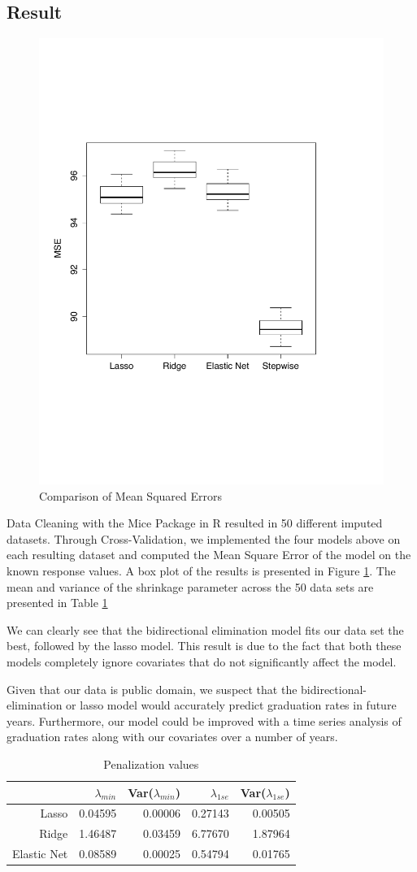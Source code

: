\documentclass{article}
\begin{document}
\subsection{Result}

\begin{figure}[h]
\begin{center}
 \includegraphics[width = .5\textwidth]{graphics/Prediction_BoxPlot.pdf}
\end{center}
\caption{Comparison of Mean Squared Errors \label{boxplot}}
\end{figure}

Data Cleaning with the Mice Package in R resulted in 50 different imputed datasets. Through Cross-Validation, we implemented the four models above on each resulting dataset and computed the Mean Square Error of the model on the known response values. A box plot of the results is presented in Figure \ref{boxplot}.  The mean and variance of the shrinkage parameter across the 50 data sets are presented in Table \ref{lambda}

We can clearly see that the bidirectional elimination model fits our data set the best, followed by the lasso model. This result is due to the fact that both these models completely ignore covariates that do not significantly affect the model. 

Given that our data is public domain, we suspect that the bidirectional-elimination or lasso model would accurately predict graduation rates in future years. Furthermore, our model could be improved with a time series analysis of graduation rates along with our covariates over a number of years.

\begin{table}[ht]
\caption{Penalization values}
\label{lambda}
\centering
\begin{tabular}{r|rr|rr}
  \hline
 & $\lambda_{min}$ & Var($\lambda_{min}$) & $\lambda_{1se}$ & Var($\lambda_{1se}$) \\ 
  \hline
Lasso & 0.04595 & 0.00006 & 0.27143 & 0.00505 \\ 
  Ridge & 1.46487 & 0.03459 & 6.77670 & 1.87964 \\ 
  Elastic Net & 0.08589 & 0.00025 & 0.54794 & 0.01765 \\ 
   \hline
\end{tabular}
\end{table}
\end{document}
